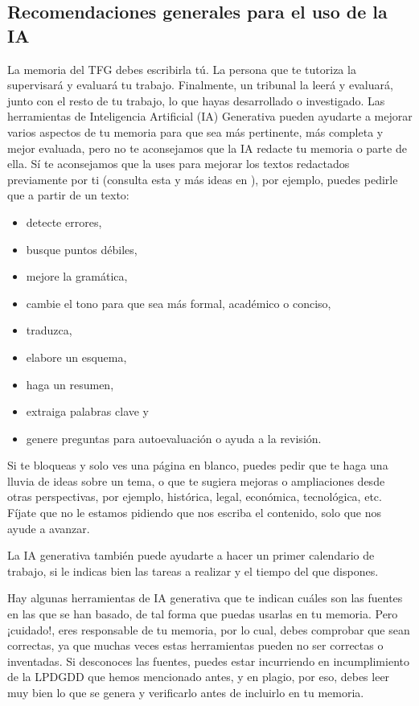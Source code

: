 \subsection{Recomendaciones generales para el uso de la IA} %
La memoria del TFG debes escribirla tú. La persona que te tutoriza la supervisará y evaluará tu trabajo. Finalmente, un tribunal la leerá y evaluará, junto con el resto de tu trabajo, lo que hayas desarrollado o investigado. Las herramientas de Inteligencia Artificial (IA) Generativa pueden ayudarte a mejorar varios aspectos de tu memoria para que sea más pertinente, más completa y mejor evaluada, pero no te aconsejamos que la IA redacte tu memoria o parte de ella. Sí te aconsejamos que la uses para mejorar los textos redactados previamente por ti (consulta esta y más ideas en \cite{IAGenerativaUNED}), por ejemplo, puedes pedirle que a partir de un texto: 
\begin{itemize}  
    \item detecte errores,
    \item busque puntos débiles,
    \item mejore la gramática,
    \item cambie el tono para que sea más formal, académico o conciso,
    \item traduzca,
    \item elabore un esquema,
    \item haga un resumen,
    \item extraiga palabras clave y 
    \item genere preguntas para autoevaluación o ayuda a la revisión.
\end{itemize} 

Si te bloqueas y solo ves una página en blanco, puedes pedir que te haga una lluvia de ideas sobre un tema, o que te sugiera mejoras o ampliaciones desde otras perspectivas, por ejemplo, histórica, legal, económica, tecnológica, etc. Fíjate que no le estamos pidiendo que nos escriba el contenido, solo que nos ayude a avanzar.

La IA generativa también puede ayudarte a hacer un primer calendario de trabajo, si le indicas bien las tareas a realizar y el tiempo del que dispones.

Hay algunas herramientas de IA generativa que te indican cuáles son las fuentes en las que se han basado, de tal forma que puedas usarlas en tu memoria. Pero ¡cuidado!, eres responsable de tu memoria, por lo cual, debes comprobar que sean correctas, ya que muchas veces estas herramientas pueden no ser correctas o inventadas. Si desconoces las fuentes, puedes estar incurriendo en incumplimiento de la LPDGDD que hemos mencionado antes, y en plagio, por eso, debes leer muy bien lo que se genera y verificarlo antes de incluirlo en tu memoria.

